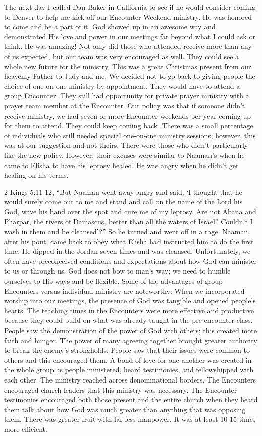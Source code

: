 \documentclass[oneside]{book}
\begin{document}
The next day I called Dan Baker in California to see if he would consider coming to Denver to help me kick-off our Encounter Weekend ministry. He was honored to come and be a part of it. God showed up in an awesome way and demonstrated His love and power in our meetings far beyond what I could ask or think. He was amazing! Not only did those who attended receive more than any of us expected, but our team was very encouraged as well. They could see a whole new future for the ministry. This was a great Christmas present from our heavenly Father to Judy and me. We decided not to go back to giving people the choice of one-on-one ministry by appointment. They would have to attend a group Encounter. They still had opportunity for private prayer ministry with a prayer team member at the Encounter. Our policy was that if someone didn’t receive ministry, we had seven or more Encounter weekends per year coming up for them to attend. They could keep coming back. There was a small percentage of individuals who still needed special one-on-one ministry sessions; however, this was at our suggestion and not theirs. There were those who didn’t particularly like the new policy. However, their excuses were similar to Naaman’s when he came to Elisha to have his leprosy healed. He was angry when he didn’t get healing on his terms.

2 Kings 5:11-12,  “But Naaman went away angry and said, ‘I thought that he would surely come out to me and stand and call on the name of the Lord his God, wave his hand over the spot and cure me of my leprosy. Are not Abana and Pharpar, the rivers of Damascus, better than all the waters of Israel? Couldn’t I wash in them and be cleansed’?” So he turned and went off in a rage. Naaman, after his pout, came back to obey what Elisha had instructed him to do the first time. He dipped in the Jordan seven times and was cleansed. Unfortunately, we often have preconceived conditions and expectations about how God can minister to us or through us. God does not bow to man’s way; we need to humble ourselves to His ways and be flexible. 
Some of the advantages of  group Encounters versus individual ministry are noteworthy:
When we incorporated worship into our meetings, the presence of God was tangible and opened people’s hearts.
The teaching times in the Encounters were more effective and productive because they could build on what was already taught in the pre-encounter class.
People saw the demonstration of the power of God with others; this created more faith and hunger.
The power of many agreeing together brought greater authority to break the enemy’s strongholds.
People saw that their issues were common to others and this encouraged them.
A bond of love for one another was created in the whole group as people ministered, heard testimonies, and fellowshipped with each other.
The ministry reached across denominational borders. 
The Encounters encouraged church leaders that this ministry was necessary.
The Encounter testimonies encouraged both those present and the entire church when they heard them talk about how God was much greater than anything that was opposing them.
There was greater fruit with far less manpower. It was at least 10-15 times more efficient.
\end{document}
